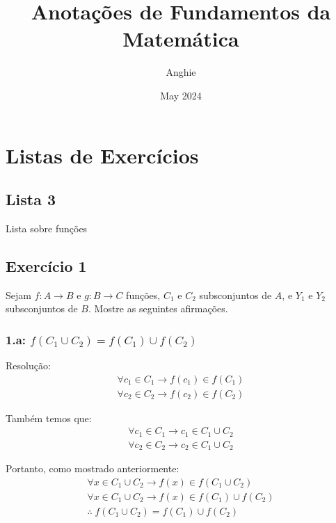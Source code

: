 \documentclass{article}
\title{Anotações de Fundamentos da Matemática}
\author{Anghie}
\date{May 2024}
\begin{document}
    \maketitle

    \tableofcontents
    \newpage

    \section{Listas de Exercícios}
    \subsection{Lista 3}
    Lista sobre funções
    \subsection*{Exercício 1}
    Sejam $f:A\rightarrow B$ e $g:B\rightarrow C$ funções, $C_1$
    e $C_2$ subsconjuntos de $A$, e $Y_1$ e $Y_2$ subsconjuntos
    de $B$. Mostre as seguintes afirmações.
    \subsubsection*{1.a: $f(C_1\cup C_2) = f(C_1)\cup f(C_2)$}
    Resolução:
    \begin{equation*}
        \begin{aligned}
            \forall c_1\in C_1 \rightarrow f(c_1)\in f(C_1) \\
            \forall c_2\in C_2 \rightarrow f(c_2)\in f(C_2)
        \end{aligned}
    \end{equation*}

    Também temos que:
    \begin{equation*}
        \begin{aligned}
            \forall c_1\in C_1 \rightarrow c_1\in C_1\cup C_2 \\
            \forall c_2\in C_2 \rightarrow c_2\in C_1\cup C_2
        \end{aligned}
    \end{equation*}

    Portanto, como mostrado anteriormente:
    \begin{equation*}
        \begin{aligned}
            \forall x\in C_1\cup C_2 \rightarrow f(x)\in
            f(C_1\cup C_2) \\
            \forall x\in C_1\cup C_2 \rightarrow f(x)\in
            f(C_1)\cup f(C_2) \\
            \therefore \; f(C_1\cup C_2) = f(C_1)\cup f(C_2)
        \end{aligned}
    \end{equation*}
\end{document}

